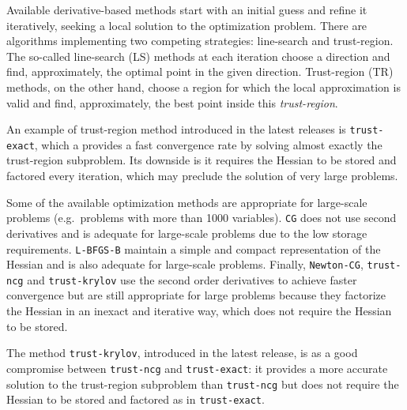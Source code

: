 Available derivative-based methods start with an initial guess and refine it iteratively, seeking
a local solution to the optimization problem. There are algorithms implementing two competing strategies:
line-search and trust-region. The so-called line-search (LS) methods at each iteration choose a direction
and find, approximately, the optimal point in the given direction. Trust-region (TR) methods, on the other
hand, choose a region for which the local approximation is valid and find, approximately, the  best point
inside this \textit{trust-region}.

An example of trust-region method introduced in the latest releases is \texttt{trust-exact},
which a  provides a fast convergence rate by solving  almost exactly the trust-region subproblem.
Its downside is it requires the Hessian to be stored and factored every iteration, which may preclude
the solution of very large problems.

Some of the available optimization methods are appropriate for large-scale problems
(e.g.~problems with more than 1000 variables).
\texttt{CG} does not use second derivatives and is adequate for large-scale problems due to the low storage requirements.
\texttt{L-BFGS-B} maintain a simple and compact representation of the Hessian and is also adequate for large-scale problems.
Finally, \texttt{Newton-CG}, \texttt{trust-ncg} and \texttt{trust-krylov} use the second order derivatives to achieve faster
convergence but are still appropriate for large problems because they factorize the Hessian in an inexact and iterative way,
which does not require the Hessian to be stored.

The method \texttt{trust-krylov}, introduced in the latest release, is as a good compromise between
\texttt{trust-ncg} and \texttt{trust-exact}: it provides a more accurate solution to the trust-region
subproblem than \texttt{trust-ncg} but does not require the Hessian to be stored and factored as in \texttt{trust-exact}.
